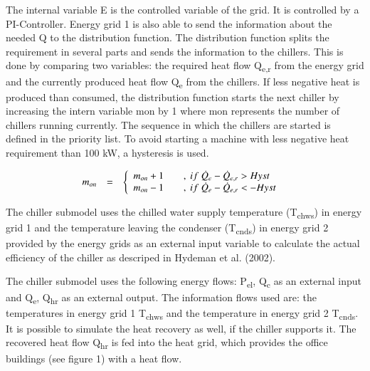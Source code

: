 \documentclass[3p,times,procedia,twocolumn,twoside]{elsarticle}
\begin{document}
The internal variable E is the controlled variable of the grid. It is controlled by a PI-Controller. Energy grid 1 is also able to send the information about the needed Q to the distribution function. The distribution function splits the requirement in several parts and sends the information to the chillers. This is done by comparing two variables: the required heat flow Q\textsubscript{e,r} from the energy grid and the currently produced heat flow Q\textsubscript{e} from the chillers. If less negative heat is produced than consumed, the distribution function starts the next chiller by increasing the intern variable mon by 1 where mon represents the number of chillers running currently. The sequence in which the chillers are started is defined in the priority list. To avoid starting a machine with less negative heat requirement than 100 kW, a hysteresis is used.

\begin{equation}
\begin{array}{@{}lcl}
\displaystyle 

m_{on} &=&  
\left\{ \begin{array}{lcl}
m_{on} + 1 & &,\ if\ \dot{Q}_{e} - \dot{Q}_{e,r} > Hyst \\ 
m_{on} - 1 & &,\ if\ \dot{Q}_{e} - \dot{Q}_{e,r} < -Hyst
\end{array}\right.

\\[6pt]
\end{array}\vspace*{-12pt}
\end{equation}


The chiller submodel uses the chilled water supply temperature (T\textsubscript{chws}) in energy grid 1 and the temperature leaving the condenser (T\textsubscript{cnds}) in energy grid 2 provided by the energy grids as an external input variable to calculate the actual efficiency of the chiller as descriped in Hydeman et al. (2002). 

The chiller submodel uses the following energy flows: P\textsubscript{el}, Q\textsubscript{c} as an external input and Q\textsubscript{e}, Q\textsubscript{hr} as an external output. The information flows used are: the temperatures in energy grid 1 T\textsubscript{chws} and the temperature in energy grid 2 T\textsubscript{cnds}. It is possible to simulate the heat recovery as well, if the chiller supports it. The recovered heat flow Q\textsubscript{hr} is fed into the heat grid, which provides the office buildings (see figure 1) with a heat flow.
\end{document}
